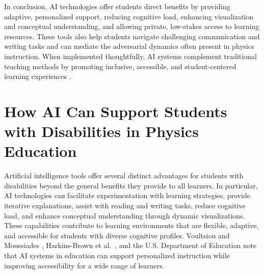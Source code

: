 \documentclass[]{aastex701}
\begin{document}
In conclusion, AI technologies offer students direct benefits by providing adaptive, personalized support, reducing cognitive load, enhancing visualization and conceptual understanding, and allowing private, low-stakes access to learning resources. These tools also help students navigate challenging communication and writing tasks and can mediate the adversarial dynamics often present in physics instruction. When implemented thoughtfully, AI systems complement traditional teaching methods by promoting inclusive, accessible, and student-centered learning experiences \citep{Paglialunga2025, Voultsiou2025, HarkinsBrown2025, Sweller2011, Khowaja2025, Alenezi2025, Finkelstein2005}.


\section{How AI Can Support Students with Disabilities in Physics Education}

Artificial intelligence tools offer several distinct advantages for students with disabilities beyond the general benefits they provide to all learners. In particular, AI technologies can facilitate experimentation with learning strategies, provide iterative explanations, assist with reading and writing tasks, reduce cognitive load, and enhance conceptual understanding through dynamic visualizations. These capabilities contribute to learning environments that are flexible, adaptive, and accessible for students with diverse cognitive profiles. Voultsiou and Moussiades \citep{Voultsiou2025}, Harkins-Brown et al.\ \citep{HarkinsBrown2025}, and the U.S. Department of Education \citep{USDOE2023} note that AI systems in education can support personalized instruction while improving accessibility for a wide range of learners.
\end{document}
